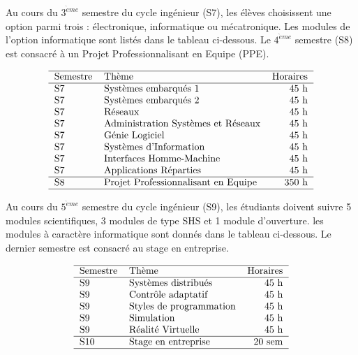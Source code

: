 Au cours du $3^{\grave eme}$ semestre du cycle ingénieur (S7), 
les élèves choisissent une option parmi trois : électronique, informatique 
ou mécatronique. Les modules de l'option informatique
sont listés dans le tableau ci-dessous. Le $4^{\grave eme}$ semestre (S8) 
est consacré à un Projet Professionnalisant en Equipe (PPE).

$$\begin{tabular}{llr}
\hline
Semestre & Thème & Horaires \\
\hline
S7  & Systèmes embarqués 1                 & 45 h \\
S7  & Systèmes embarqués 2                 & 45 h \\
S7  & Réseaux                              & 45 h \\
S7  & Administration Systèmes et Réseaux   & 45 h \\
S7  & Génie Logiciel                       & 45 h \\
S7  & Systèmes d'Information               & 45 h \\
S7  & Interfaces Homme-Machine             & 45 h \\
S7  & Applications Réparties               & 45 h \\
\hline
S8  & Projet Professionnalisant en Equipe  & 350 h \\
\hline
\end{tabular}$$

Au cours du $5^{\grave eme}$ semestre du cycle ingénieur (S9),
les étudiants doivent suivre 5 modules scientifiques,
3 modules de type SHS et 1 module d'ouverture. 
les modules à caractère informatique sont donnés dans le tableau ci-dessous.
Le dernier semestre 
est consacré au stage en entreprise. 

$$\begin{tabular}{llr}
\hline
Semestre & Thème & Horaires \\
\hline
S9  & Systèmes distribués                       & 45 h \\
S9  & Contrôle adaptatif                        & 45 h \\
S9  & Styles de programmation                   & 45 h \\
S9  & Simulation                                & 45 h \\
S9  & Réalité Virtuelle                         & 45 h \\
\hline
S10 & Stage en entreprise & 20 sem \\
\hline
\end{tabular}$$


